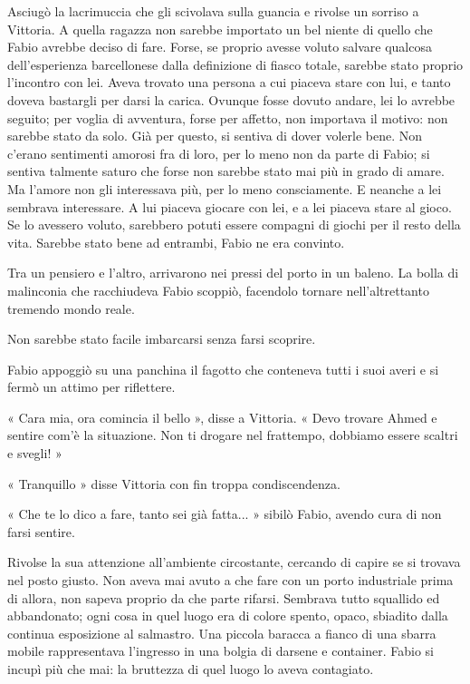 Asciugò la lacrimuccia che gli scivolava sulla guancia e rivolse un sorriso a Vittoria. A quella ragazza non sarebbe importato un bel niente di quello che Fabio avrebbe deciso di fare. Forse, se proprio avesse voluto salvare qualcosa dell'esperienza barcellonese dalla definizione di fiasco totale, sarebbe stato proprio l'incontro con lei. Aveva trovato una persona a cui piaceva stare con lui, e tanto doveva bastargli per darsi la carica. Ovunque fosse dovuto andare, lei lo avrebbe seguito; per voglia di avventura, forse per affetto, non importava il motivo: non sarebbe stato da solo. Già per questo, si sentiva di dover volerle bene. Non c'erano sentimenti amorosi fra di loro, per lo meno non da parte di Fabio; si sentiva talmente saturo che forse non sarebbe stato mai più in grado di amare. Ma l'amore non gli interessava più, per lo meno consciamente. E neanche a lei sembrava interessare. A lui piaceva giocare con lei, e a lei piaceva stare al gioco. Se lo avessero voluto, sarebbero potuti essere compagni di giochi per il resto della vita. Sarebbe stato bene ad entrambi, Fabio ne era convinto.

Tra un pensiero e l'altro, arrivarono nei pressi del porto in un baleno. La bolla di malinconia che racchiudeva Fabio scoppiò, facendolo tornare nell'altrettanto tremendo mondo reale. 

Non sarebbe stato facile imbarcarsi senza farsi scoprire. 

Fabio appoggiò su una panchina il fagotto che conteneva tutti i suoi averi e si fermò un attimo per riflettere.

« Cara mia, ora comincia il bello », disse a Vittoria. « Devo trovare Ahmed e sentire com'è la situazione. Non ti drogare nel frattempo, dobbiamo essere scaltri e svegli! »

« Tranquillo » disse Vittoria con fin troppa condiscendenza.

« Che te lo dico a fare, tanto sei già fatta... » sibilò Fabio, avendo cura di non farsi sentire.

Rivolse la sua attenzione all'ambiente circostante, cercando di capire se si trovava nel posto giusto. Non aveva mai avuto a che fare con un porto industriale prima di allora, non sapeva proprio da che parte rifarsi. Sembrava tutto squallido ed abbandonato; ogni cosa in quel luogo era di colore spento, opaco, sbiadito dalla continua esposizione al salmastro. Una piccola baracca a fianco di una sbarra mobile rappresentava l'ingresso in una bolgia di darsene e container. Fabio si incupì più che mai: la bruttezza di quel luogo lo aveva contagiato.

